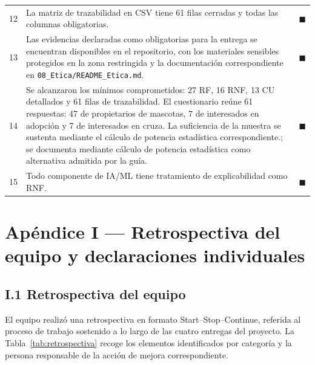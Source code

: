 \documentclass[journal,onecolumn]{IEEEtran}
\begin{document}
\begin{table}[H]
\begin{tabularx}{\textwidth}{@{}c X c@{}}
			12 & La matriz de trazabilidad en CSV tiene 61 filas cerradas y todas las columnas obligatorias. &$\blacksquare$ \\
			13 & Las evidencias declaradas como obligatorias para la entrega se encuentran disponibles en el repositorio, con los materiales sensibles protegidos en la zona restringida y la documentación correspondiente en \texttt{08\_Etica/README\_Etica.md}. & $\blacksquare$ \\
			14 & Se alcanzaron los mínimos comprometidos: 27 RF, 16 RNF, 13 CU detallados y 61 filas de trazabilidad. El cuestionario reúne 61 respuestas: 47 de propietarios de mascotas, 7 de interesados en adopción y 7 de interesados en cruza. La suficiencia de la muestra se sustenta mediante el cálculo de potencia estadística correspondiente.; se documenta mediante cálculo de potencia estadística como alternativa admitida por la guía. & $\blacksquare$ \\
			15 & Todo componente de IA/ML tiene tratamiento de explicabilidad como RNF. & $\blacksquare$ \\
			\bottomrule
		\end{tabularx}
	\end{table}
	
	
\section*{Apéndice I --- Retrospectiva del equipo y declaraciones individuales}
\label{ap:retrospectiva}

\subsection*{I.1 Retrospectiva del equipo}
\label{sec:retrospectiva}

El equipo realizó una retrospectiva en formato Start--Stop--Continue,
referida al proceso de trabajo sostenido a lo largo de las cuatro entregas
del proyecto. La Tabla~\ref{tab:retrospectiva} recoge los elementos
identificados por categoría y la persona responsable de la acción de
mejora correspondiente.
\end{document}
